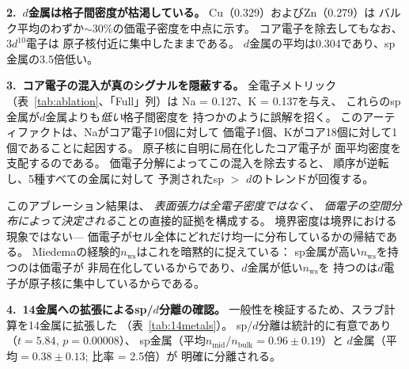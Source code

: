 \documentclass[twocolumn,showpacs,preprintnumbers,amsmath,amssymb,prb]{revtex4-2}
\begin{document}
\textbf{2.\ $d$金属は格子間密度が枯渇している。}
Cu（0.329）およびZn（0.279）は
バルク平均のわずか$\sim\!30\%$の価電子密度を中点に示す。
コア電子を除去してもなお、$3d^{10}$電子は
原子核付近に集中したままである。
$d$金属の平均は0.304であり、sp金属の3.5倍低い。

\textbf{3.\ コア電子の混入が真のシグナルを隠蔽する。}
全電子メトリック（表~\ref{tab:ablation}、「Full」列）は
Na = 0.127、K = 0.137を与え、
これらのsp金属が$d$金属よりも\emph{低い}格子間密度を
持つかのように誤解を招く。
このアーティファクトは、Naがコア電子10個に対して
価電子1個、Kがコア18個に対して1個であることに起因する。
原子核に自明に局在化したコア電子が
面平均密度を支配するのである。
価電子分解によってこの混入を除去すると、
順序が逆転し、5種すべての金属に対して
予測されたsp $>$ $d$のトレンドが回復する。

このアブレーション結果は、
\emph{表面張力は全電子密度ではなく、
価電子の空間分布によって決定される}ことの直接的証拠を構成する。
境界密度は境界における現象ではない---
価電子がセル全体にどれだけ均一に分布しているかの帰結である。
Miedemaの経験的$n_\mathrm{ws}$はこれを暗黙的に捉えている：
sp金属が高い$n_\mathrm{ws}$を持つのは価電子が
非局在化しているからであり、$d$金属が低い$n_\mathrm{ws}$を
持つのは$d$電子が原子核に集中しているからである。

\textbf{4.\ 14金属への拡張によるsp/$d$分離の確認。}
一般性を検証するため、スラブ計算を14金属に拡張した
（表~\ref{tab:14metals}）。
sp/$d$分離は統計的に有意であり
（$t = 5.84$, $p = 0.00008$）、
sp金属（平均$n_\mathrm{mid}/n_\mathrm{bulk} = 0.96 \pm 0.19$）と
$d$金属（平均$= 0.38 \pm 0.13$; 比率 = 2.5倍）が
明確に分離される。
\end{document}
